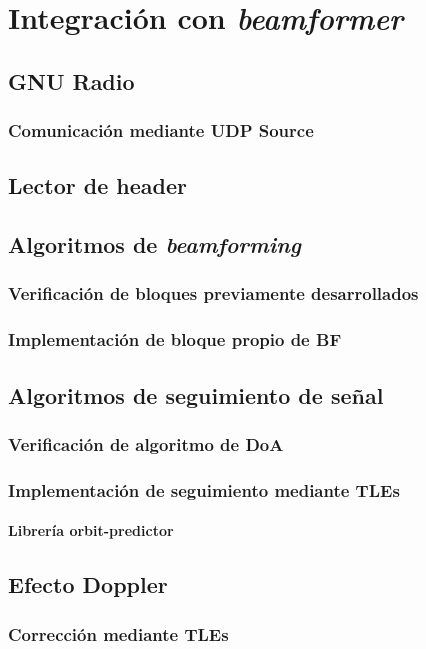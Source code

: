 \documentclass[../../main.tex]{subfiles}
\begin{document}
\graphicspath{{./figures}}
\chapter{Integración con \textit{beamformer}}

\section{GNU Radio}
\subsection{Comunicación mediante UDP Source}

\section{Lector de header}

\section{Algoritmos de \textit{beamforming}}
\subsection{Verificación de bloques previamente desarrollados}
\subsection{Implementación de bloque propio de BF}

\section{Algoritmos de seguimiento de señal}
\subsection{Verificación de algoritmo de DoA}
\subsection{Implementación de seguimiento mediante TLEs}
\subsubsection{Librería orbit-predictor}

\section{Efecto Doppler}
\subsection{Corrección mediante TLEs}
\end{document}
